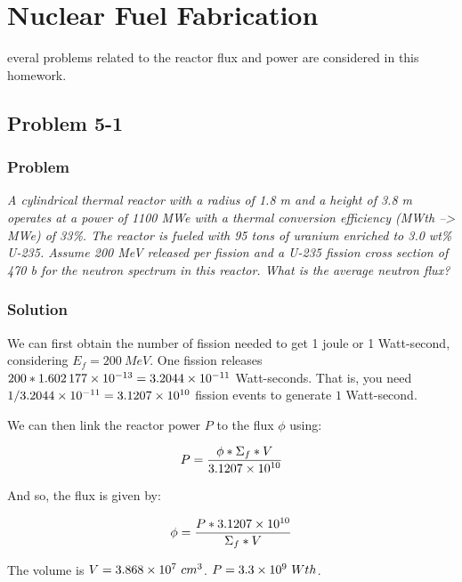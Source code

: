 %
%
\let\textcircled=\pgftextcircled
\chapter{Nuclear Fuel Fabrication}
\label{chap:intro}

everal problems related to the reactor flux and power are considered in this homework.

\section{Problem 5-1}
\label{prob51}


\subsection{Problem}
\textit{A cylindrical thermal reactor with a radius of 1.8 m and a height of 3.8 m operates at a power of 1100 MWe with a thermal conversion efficiency (MWth --> MWe) of 33\%. The reactor is fueled with 95 tons of uranium enriched to 3.0 wt\% U-235. Assume 200 MeV released per fission and a U-235 fission cross section of 470 b for the neutron spectrum in this reactor. What is the average neutron flux?}

\subsection{Solution}

We can first obtain the number of fission needed to get 1 joule or 1 Watt-second, considering $E_f = 200\ MeV$. One fission releases $200 * \text{\num{1.602177e-13}} = \text{\num{3.2044e-11}}$ Watt-seconds. That is, you need $1/\text{\num{3.2044e-11}} = \text{\num{3.1207e10}}$ fission events to generate $1$ Watt-second.

We can then link the reactor power $P$ to the flux $\phi$ using:

\begin{equation}
P = \frac{\phi * \Sigma_f * V}{\text{\num{3.1207e10}}}
\end{equation}

And so, the flux is given by:

\begin{equation}
\phi = \frac{P * \text{\num{3.1207e10}}}{\Sigma_f * V}
\end{equation}

The volume is $V = \text{\num{3.868e7}}\ cm^3$. $P = \text{\num{3.3e9}}\ Wth$.

